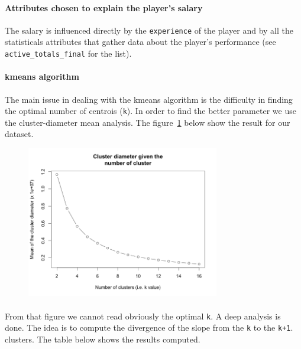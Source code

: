 \paragraph{Attributes chosen to explain the player's salary}The salary is influenced directly by the \texttt{experience} of the player and by all the statisticals attributes that gather data about the player's performance (see \texttt{active\_totals\_final} for the list).

\paragraph{kmeans algorithm}The main issue in dealing with the kmeans algorithm is the difficulty in finding the optimal number of centrois (\texttt{k}). In order to find the better parameter we use the cluster-diameter mean analysis. The figure~\ref{fig:1} below show the result for our dataset. 

\begin{figure}[h!]
\centering
\includegraphics[width=0.75\textwidth]{images/diameter_kmeans}
\label{fig:1}
\end{figure}

\paragraph{}From that figure we cannot read obviously the optimal \texttt{k}. A deep analysis is done. The idea is to compute the divergence of the slope from the \texttt{k} to the \texttt{k+1}. clusters. The table below shows the results computed.\\

